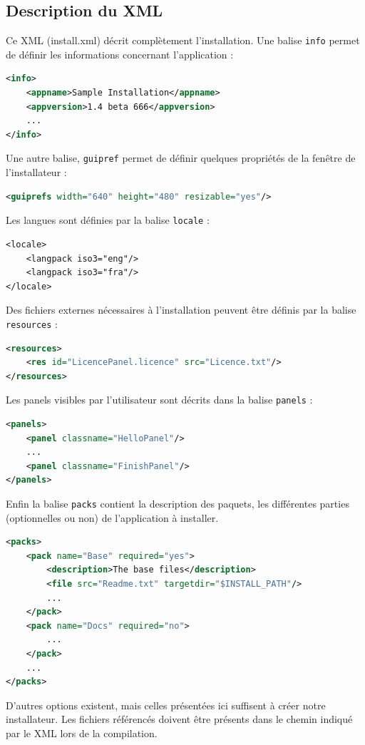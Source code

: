 \subsection{Description du XML}
Ce XML (install.xml) décrit complètement l'installation.
Une balise \verb|info| permet de définir les informations concernant l'application :
\begin{lstlisting}[language=XML]
<info>
	<appname>Sample Installation</appname>
	<appversion>1.4 beta 666</appversion>
	...
</info>
\end{lstlisting}
Une autre balise, \verb|guipref| permet de définir quelques propriétés de la fenêtre de l'installateur :
\begin{lstlisting}[language=XML]
<guiprefs width="640" height="480" resizable="yes"/>
\end{lstlisting}
Les langues sont définies par la balise \verb|locale| :
\begin{lstlisting}
<locale>
	<langpack iso3="eng"/>
	<langpack iso3="fra"/>
</locale>
\end{lstlisting}
Des fichiers externes nécessaires à l'installation peuvent être définis par la balise \verb|resources| :
\begin{lstlisting}[language=XML]
<resources>
	<res id="LicencePanel.licence" src="Licence.txt"/>
</resources>
\end{lstlisting}
Les panels visibles par l'utilisateur sont décrits dans la balise \verb|panels| :
\begin{lstlisting}[language=XML]
<panels>
	<panel classname="HelloPanel"/>
	...
	<panel classname="FinishPanel"/>
</panels>
\end{lstlisting}
Enfin la balise \verb|packs| contient la description des paquets, les différentes parties (optionnelles ou non) de l'application à installer.
\begin{lstlisting}[language=XML]
<packs>
	<pack name="Base" required="yes">
		<description>The base files</description>
		<file src="Readme.txt" targetdir="$INSTALL_PATH"/>
		...
	</pack>
	<pack name="Docs" required="no">
		...
	</pack>
	...
</packs>
\end{lstlisting}
D'autres options existent, mais celles présentées ici suffisent à créer notre installateur.
Les fichiers référencés doivent être présents dans le chemin indiqué par le XML lors de la compilation.
